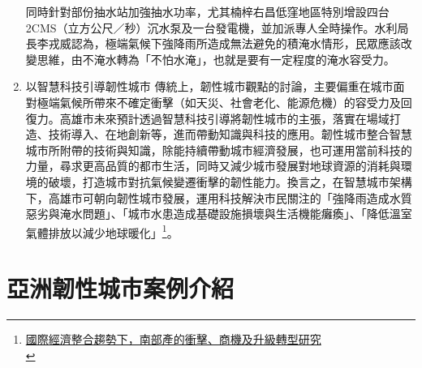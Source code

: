 \documentclass[a4paper,12pt]{article}
\begin{document}
\begin{enumerate}
同時針對部份抽水站加強抽水功率，尤其楠梓右昌低窪地區特別增設四台2CMS（立方公尺／秒）沉水泵及一台發電機，並加派專人全時操作。水利局長李戎威認為，極端氣候下強降雨所造成無法避免的積淹水情形，民眾應該改變思維，由不淹水轉為「不怕水淹」，也就是要有一定程度的淹水容受力。\\
\item 以智慧科技引導韌性城市
\label{sec:org1f63058}
傳統上，韌性城市觀點的討論，主要偏重在城市面對極端氣候所帶來不確定衝擊（如天災、社會老化、能源危機）的容受力及回復力。高雄市未來預計透過智慧科技引導將韌性城市的主張，落實在場域打造、技術導入、在地創新等，進而帶動知識與科技的應用。韌性城市整合智慧城市所附帶的技術與知識，除能持續帶動城市經濟發展，也可運用當前科技的力量，尋求更高品質的都市生活，同時又減少城市發展對地球資源的消耗與環境的破壞，打造城市對抗氣候變遷衝擊的韌性能力。換言之，在智慧城市架構下，高雄市可朝向韌性城市發展，運用科技解決市民關注的「強降雨造成水質惡劣與淹水問題」、「城市水患造成基礎設施損壞與生活機能癱瘓」、「降低溫室氣體排放以減少地球暖化」\footnote{\href{https://www.moea.gov.tw/Mns/populace/information/wHandInformation\_File.ashx?info\_id=1169}{國際經濟整合趨勢下，南部產的衝擊、商機及升級轉型研究}\\}。\\
\newpage
\end{enumerate}

\section{亞洲韌性城市案例介紹}
\label{sec:org097cdf4}
\end{document}
